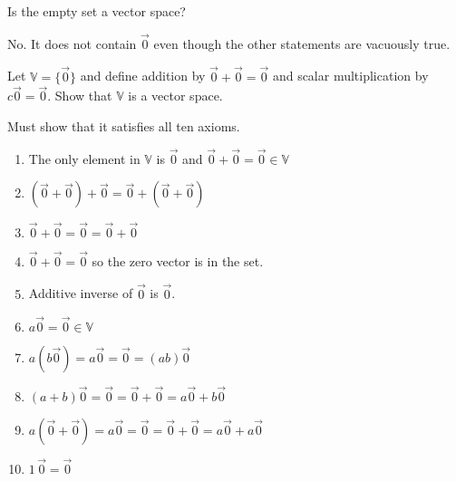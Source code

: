 \documentclass[english, 12pt]{article}
\begin{document}
\begin{exmp}
Is the empty set a vector space?
\begin{sol}
No. It does not contain $\vec{0}$ even though the other statements are vacuously true.
\end{sol}
\end{exmp}

\begin{exmp}
Let $\mathbb{V} = \{\vec{0}\}$ and define addition by $\vec{0} + \vec{0} = \vec{0}$ and scalar multiplication by $c \vec{0} = \vec{0}$. Show that $\mathbb{V}$ is a vector space.
\begin{sol}
Must show that it satisfies all ten axioms.
\begin{enumerate}
\item The only element in $\mathbb{V}$ is $\vec{0}$ and $\vec{0} + \vec{0} = \vec{0} \in \mathbb{V}$
\item $(\vec{0} + \vec{0}) + \vec{0} = \vec{0} + (\vec{0} + \vec{0})$
\item $\vec{0} + \vec{0} = \vec{0} = \vec{0} + \vec{0}$
\item $\vec{0} + \vec{0} = \vec{0}$ so the zero vector is in the set.
\item Additive inverse of $\vec{0}$ is $\vec{0}$.
\item $a\vec{0} = \vec{0} \in \mathbb{V}$
\item $a(b\vec{0}) = a\vec{0} = \vec{0} = (ab)\vec{0}$
\item $(a+b)\vec{0} = \vec{0} = \vec{0} + \vec{0} = a\vec{0} + b\vec{0}$
\item $a(\vec{0} + \vec{0}) = a\vec{0} = \vec{0} = \vec{0} + \vec{0} = a\vec{0} + a\vec{0}$
\item $1\, \vec{0} = \vec{0}$
\end{enumerate}
\end{sol}
\end{exmp}
\end{document}
